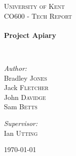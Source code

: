 \begin{titlepage}
\begin{center}


\textsc{\LARGE University of Kent}\\[1.5cm]

\textsc{\Large CO600 - Tech Report}\\[0.5cm]

\HRule \\[0.4cm]
{ \huge \bfseries Project Apiary \\[0.4cm] }

\HRule \\[1.5cm]

\begin{minipage}{0.4\textwidth}
\begin{flushleft} \large
\emph{Author:}\\
Bradley \textsc{Jones}\\
Jack \textsc{Fletcher}\\
John \textsc{Davidge}\\
Sam \textsc{Betts}\\
\end{flushleft}
\end{minipage}
\begin{minipage}{0.4\textwidth}
\begin{flushright} \large
\emph{Supervisor:} \\
Ian \textsc{Utting}
\end{flushright}
\end{minipage}

\vfill

{\large \today}

\end{center}
\end{titlepage}
